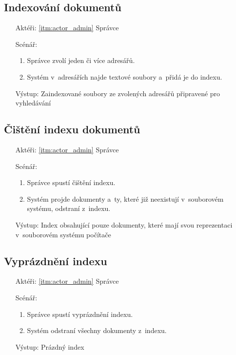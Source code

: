 \subsection{Indexování dokumentů}
\label{subsec:usecase_index}
\begin{itemize}
	\item[Aktéři:] \ref{itm:actor_admin} Správce
	\item[Scénář:]
	\begin{enumerate}
		\item Správce zvolí jeden či více adresářů.
		\item Systém v~adresářích najde textové soubory a~přidá je do indexu.\label{itm:scenary_index}
	\end{enumerate}
	\item[Výstup:] Zaindexované soubory ze zvolených adresářů připravené pro vyhledávání
\end{itemize}

\subsection{Čištění indexu dokumentů}
\label{subsec:usecase_clean}
\begin{itemize}
	\item[Aktéři:] \ref{itm:actor_admin} Správce
	\item[Scénář:]
	\begin{enumerate}
		\item Správce spustí čištění indexu.
		\item Systém projde dokumenty a~ty, které již neexistují v~souborovém systému, odstraní z~indexu.\label{itm:scenary_clean}
	\end{enumerate}
	\item[Výstup:] Index obsahující pouze dokumenty, které mají svou reprezentaci v~souborovém systému počítače
\end{itemize}

\subsection{Vyprázdnění indexu}
\begin{itemize}
	\item[Aktéři:] \ref{itm:actor_admin} Správce
	\item[Scénář:]
	\begin{enumerate}
		\item Správce spustí vyprázdnění indexu.
		\item Systém odstraní všechny dokumenty z~indexu.
	\end{enumerate}
	\item[Výstup:] Prázdný index
\end{itemize}

